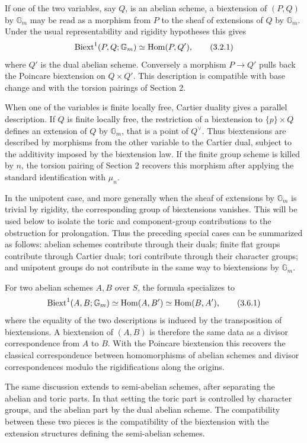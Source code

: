\documentclass[11pt]{article}
\providecommand{\Gm}{\mathbb G_m}
\providecommand{\Hom}{\operatorname{Hom}}
\begin{document}
If one of the two variables, say \(Q\), is an abelian scheme, a biextension of \((P,Q)\) by \(\Gm\) may be read as a morphism from \(P\) to the sheaf of extensions of \(Q\) by \(\Gm\).  Under the usual representability and rigidity hypotheses this gives
\[
        \Biext^1(P,Q;\Gm)\simeq \Hom(P,Q'),
\qquad\text{(3.2.1)}
\]
where \(Q'\) is the dual abelian scheme.  Conversely a morphism \(P\to Q'\) pulls back the Poincare biextension on \(Q\times Q'\).  This description is compatible with base change and with the torsion pairings of Section 2.

When one of the variables is finite locally free, Cartier duality gives a parallel description.  If \(Q\) is finite locally free, the restriction of a biextension to \(\{p\}\times Q\) defines an extension of \(Q\) by \(\Gm\), that is a point of \(Q^\vee\).  Thus biextensions are described by morphisms from the other variable to the Cartier dual, subject to the additivity imposed by the biextension law.  If the finite group scheme is killed by \(n\), the torsion pairing of Section 2 recovers this morphism after applying the standard identification with \(\mu_n\).

In the unipotent case, and more generally when the sheaf of extensions by \(\Gm\) is trivial by rigidity, the corresponding group of biextensions vanishes.  This will be used below to isolate the toric and component-group contributions to the obstruction for prolongation.  Thus the preceding special cases can be summarized as follows: abelian schemes contribute through their duals; finite flat groups contribute through Cartier duals; tori contribute through their character groups; and unipotent groups do not contribute in the same way to biextensions by \(\Gm\).

For two abelian schemes \(A,B\) over \(S\), the formula specializes to
\[
        \Biext^1(A,B;\Gm)\simeq \Hom(A,B')
        \simeq \Hom(B,A'),
\qquad\text{(3.6.1)}
\]
where the equality of the two descriptions is induced by the transposition of biextensions.  A biextension of \((A,B)\) is therefore the same data as a divisor correspondence from \(A\) to \(B\).  With the Poincare biextension this recovers the classical correspondence between homomorphisms of abelian schemes and divisor correspondences modulo the rigidifications along the origins.

The same discussion extends to semi-abelian schemes, after separating the abelian and toric parts.  In that setting the toric part is controlled by character groups, and the abelian part by the dual abelian scheme.  The compatibility between these two pieces is the compatibility of the biextension with the extension structures defining the semi-abelian schemes.
\end{document}
